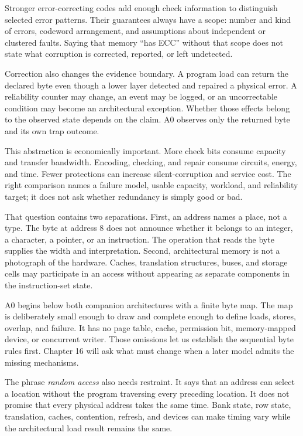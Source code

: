 Stronger error-correcting codes add enough check information to distinguish
selected error patterns. Their guarantees always have a scope: number and
kind of errors, codeword arrangement, and assumptions about independent or
clustered faults. Saying that memory ``has ECC'' without that scope does not
state what corruption is corrected, reported, or left undetected.

Correction also changes the evidence boundary. A program load can return the
declared byte even though a lower layer detected and repaired a physical
error. A reliability counter may change, an event may be logged, or an
uncorrectable condition may become an architectural exception. Whether those
effects belong to the observed state depends on the claim. A0 observes only
the returned byte and its own trap outcome.

This abstraction is economically important. More check bits consume capacity
and transfer bandwidth. Encoding, checking, and repair consume circuits,
energy, and time. Fewer protections can increase silent-corruption and service
cost. The right comparison names a failure model, usable capacity, workload,
and reliability target; it does not ask whether redundancy is simply good or
bad.

That question contains two separations. First, an address names a place, not
a type. The byte at address 8 does not announce whether it belongs to an
integer, a character, a pointer, or an instruction. The operation that reads
the byte supplies the width and interpretation. Second, architectural memory
is not a photograph of the hardware. Caches, translation structures, buses,
and storage cells may participate in an access without appearing as separate
components in the instruction-set state.

A0 begins below both companion architectures with a finite byte map. The map
is deliberately small enough to draw and complete enough to define loads,
stores, overlap, and failure. It has no page table, cache, permission bit,
memory-mapped device, or concurrent writer. Those omissions let us establish
the sequential byte rules first. Chapter 16 will ask what must change when a
later model admits the missing mechanisms.

The phrase \emph{random access} also needs restraint. It says that an address
can select a location without the program traversing every preceding location.
It does not promise that every physical address takes the same time. Bank
state, row state, translation, caches, contention, refresh, and devices can
make timing vary while the architectural load result remains the same.

